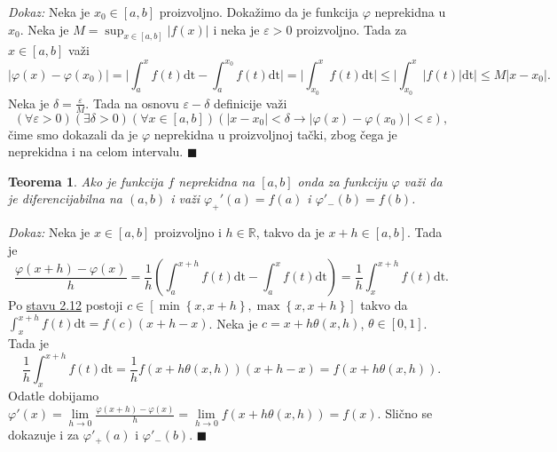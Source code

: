 \documentclass{article}
\newtheorem{teorema}{Teorema}[section]
\begin{document}
\textit{Dokaz:} Neka je $x_0 \in \left[a ,b\right]$ proizvoljno.
Dokažimo da je funkcija $\varphi$ neprekidna u $x_0$.
Neka je $M = \displaystyle \sup_{x\in\left[a,b\right]} | f\left(x\right) |$ i neka je $\varepsilon > 0$
proizvoljno. Tada za $x\in\left[a,b\right]$ važi
\begin{equation*}
    \displaystyle |\varphi\left(x\right) - \varphi\left(x_0\right)| = \bigg|\int^x_a f\left(t\right)\text{dt} - \int^{x_0}_a f\left(t\right)\text{dt}\bigg| = \bigg|\int^x_{x_0}f\left(t\right)\text{dt}\bigg| \leq \bigg|\int^x_{x_0}|f\left(t\right)|\text{dt}\bigg| \leq M|x - x_0|.
\end{equation*}
Neka je $\delta=\frac{\varepsilon}{M}$. Tada na osnovu $\varepsilon - \delta$ definicije važi
$$    \displaystyle \left(\forall \varepsilon > 0\right)\left(\exists \delta > 0\right)\left(\forall x\in \left[a, b\right]\right)\left(|x-x_0| < \delta \longrightarrow |\varphi\left(x\right) - \varphi\left(x_0\right)| < \varepsilon\right),$$
čime smo dokazali da je $\varphi$ neprekidna u proizvoljnoj tački, zbog čega je neprekidna i na celom intervalu.
\null\hfill $\blacksquare$\par

\begin{teoremabox}
    \label{teorema_2.8}
    \begin{teorema}
        Ako je funkcija $f$ neprekidna na $\left[a, b\right]$ onda za funkciju $\varphi$
        važi da je diferencijabilna na $\left(a,b\right)$ i važi $\varphi_+'\left(a\right) = f\left(a\right)$ i $\varphi'_-\left(b\right) = f\left(b\right)$.
    \end{teorema}
\end{teoremabox}

\textit{Dokaz:} Neka je $x \in \left[a, b\right]$ proizvoljno i $h \in \mathbb{R}$,
takvo da je $x+h\in\left[a,b\right]$. Tada je
$$    \frac{\varphi\left(x+h\right) - \varphi\left(x\right)}{h}  = \frac{1}{h} \left( \int^{x+h}_a f\left(t\right)\text{dt} - \int^x_a f\left(t\right)\text{dt}\right) = \frac{1}{h} \int^{x+h}_x f\left(t\right)\text{dt}.$$
Po \hyperref[stav_2.12]{stavu 2.12} postoji $c\in\left[\min\left\{x, x+h\right\}, \max\left\{x, x+h\right\}\right]$ takvo da
$\displaystyle\int^{x+h}_x f\left(t\right)\text{dt}=f\left(c\right)\left(x+h-x\right)$.
Neka je $c=x+h\theta\left(x,h\right)$, $\theta\in\left[0,1\right]$. Tada je
$$ \frac{1}{h} \int^{x+h}_x f\left(t\right)\text{dt}=\frac{1}{h} f\left(x+h\theta\left(x,h\right)\right)\left(x+h-x\right)=f\left(x+h\theta\left(x,h\right)\right).$$
Odatle dobijamo $\displaystyle \varphi'\left(x\right) =\lim\limits_{h\longrightarrow 0}\frac{\varphi\left(x+h\right) - \varphi\left(x\right)}{h} = \lim\limits_{h\longrightarrow 0} f\left(x+h\theta\left(x, h\right)\right)= f\left(x\right)$.
Slično se dokazuje i za $\varphi'_+\left(a\right)$ i $\varphi'_-\left(b\right)$.
\null\hfill $\blacksquare$\par
\end{document}
